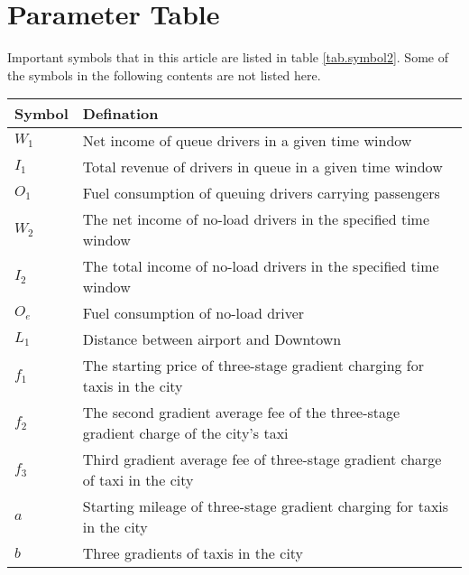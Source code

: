 \section{Parameter Table}
Important symbols that in this article are listed in table \ref{tab.symbol2}. Some of the symbols in the following contents are not listed here.
\begin{table}[H]
             \centering
                \begin{tabular}{|l|l|}
                \hline
                \textbf{Symbol} & \textbf{Defination} \\
                \hline
                 ${W}_1$ & Net income of queue drivers in a given time window\\

                ${I}_1$ & Total revenue of drivers in queue in a given time window\\

                ${O}_1$ & Fuel consumption of queuing drivers carrying passengers\\

                ${W}_2$ & The net income of no-load drivers in the specified time window\\

                ${I}_2$ & The total income of no-load drivers in the specified time window\\

                ${O}_e$ & Fuel consumption of no-load driver\\
                
                $L_{1}$ & Distance between airport and Downtown\\

                $f_{1}$ & The starting price of three-stage gradient charging for taxis in the city \\

                $f_{2}$ & The second gradient average fee of the three-stage gradient charge of the city's taxi \\

                $f_{3}$ & Third gradient average fee of three-stage gradient charge of taxi in the city \\
                
                $a$ & Starting mileage of three-stage gradient charging for taxis in the city\\
                
                $b$ & Three gradients of taxis in the city\\
                

\end{tabular}
\end{table}
